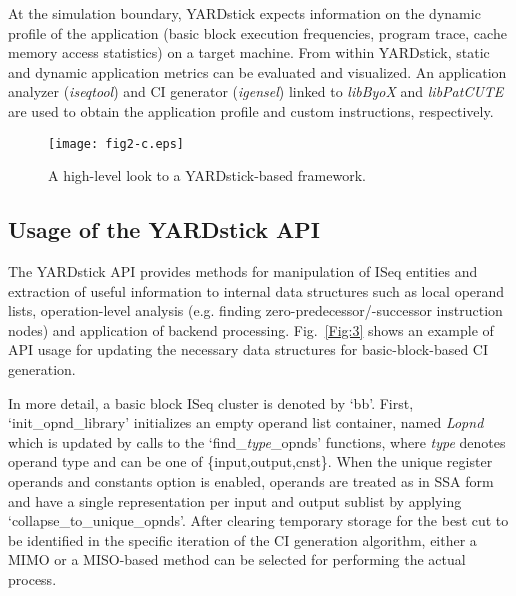 \documentclass{comjnl}
\begin{document}
At the simulation boundary, YARDstick expects information on the dynamic profile of the application (basic block execution frequencies, program trace, cache memory access statistics) on a target machine. From within YARDstick, static and dynamic application metrics can be evaluated and visualized. An application analyzer ({\it iseqtool}) and CI generator ({\it igensel}) linked to {\it libByoX} and {\it libPatCUTE} are used to obtain the application profile and custom instructions, respectively. 

\begin{figure}[tb]
  \centering
  \texttt{[image: fig2-c.eps]}
  \caption{A high-level look to a YARDstick-based framework.}
  \label{Fig:2}
  \vspace{-0.25cm}
\end{figure}

\subsection{Usage of the YARDstick API}
\label{Sec:APIUsage}
The YARDstick API provides methods for manipulation of ISeq entities and extraction of useful information to internal data structures such as local operand lists, operation-level 
analysis (e.g. finding zero-predecessor/-successor instruction nodes) and application of backend processing. Fig.~\ref{Fig:3} shows an example of API usage for updating the necessary data structures for basic-block-based CI generation. 

In more detail, a basic block ISeq cluster is denoted by `bb'. First, `init\_opnd\_library' initializes an empty operand list container, named {\it Lopnd} which is updated by calls to the `find\_{\it type}\_opnds' functions, where {\it type} denotes operand type and can be one of \{input,output,cnst\}. When the unique register operands and constants option is enabled, operands are treated as in SSA form and have a single representation per input and output sublist by applying `collapse\_to\_unique\_opnds'. After clearing temporary storage for the best cut to be identified in the specific iteration of the CI generation algorithm, either a MIMO or a MISO-based method can be selected for performing the actual process.
\end{document}
